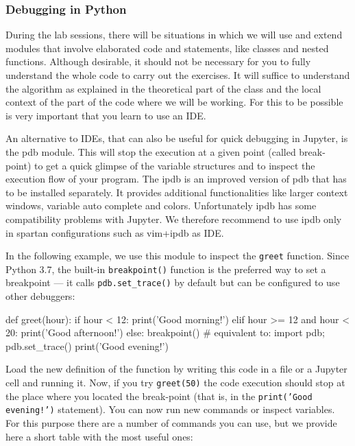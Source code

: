 \subsubsection{Debugging in Python}

During the lab sessions, there will be situations in which we will use and extend modules that involve elaborated code and statements, like classes and nested functions. Although desirable, it should not be necessary for you to fully understand the whole code to carry out the exercises. It will suffice to understand the algorithm as explained in the theoretical part of the class and the local context of the part of the code where we will be working. For this to be possible is very important that you learn to use an IDE. 

An alternative to IDEs, that can also be useful for quick debugging in Jupyter, is the pdb module. This will stop the execution at a given point (called break-point) to get a quick glimpse of the variable structures and to inspect the execution flow of your program. The ipdb is an improved version of pdb that has to be installed separately. It provides additional functionalities like larger context windows, variable auto complete and colors. Unfortunately ipdb has some compatibility problems with Jupyter. We therefore recommend to use ipdb only in spartan configurations such as vim+ipdb as IDE.

\noindent In the following example, we use this module to inspect the \texttt{greet} function. Since Python 3.7, the built-in \texttt{breakpoint()} function is the preferred way to set a breakpoint — it calls \texttt{pdb.set\_trace()} by default but can be configured to use other debuggers:

\begin{python}
def greet(hour):
    if hour < 12:
        print('Good morning!')
    elif hour >= 12 and hour < 20:
        print('Good afternoon!')
    else:
        breakpoint()  # equivalent to: import pdb; pdb.set_trace()
        print('Good evening!')
\end{python}

Load the new definition of the function by writing this code in a file or a Jupyter cell and running it. Now, if you try \texttt{greet(50)} the code execution should stop at the place where you located the break-point (that is, in the \texttt{print('Good evening!')} statement). You can now run new commands or inspect variables. For this purpose there are a number of commands you can use\footnotemark{}, but we provide here a short table with the most useful ones: 

